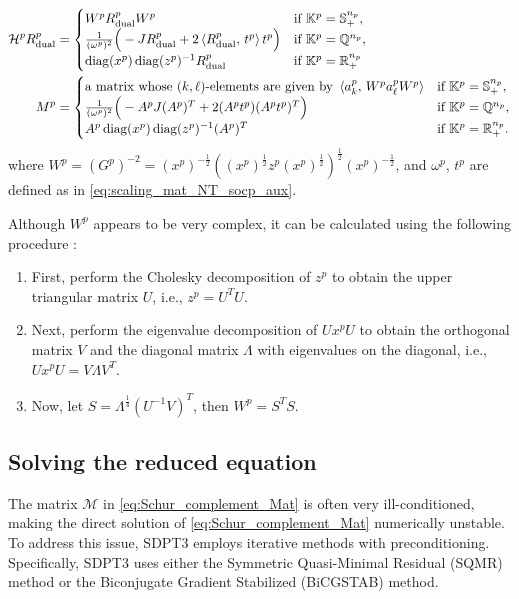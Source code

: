 \begin{align}
    \mathcal{H}^p R^p_{\text{dual}} &= \begin{cases}
        W^p R^p_{\text{dual}} W^p & \text{if } \mathbb{K}^p = \mathbb{S}^{n_p}_+, \\
        \frac{1}{(\omega^p)^2} \Big(-J R^p_{\text{dual}} + 2\left\langle R^p_{\text{dual}}, \, t^p \right\rangle t^p\Big) & \text{if } \mathbb{K}^p = \mathbb{Q}^{n_p},\\
        \operatorname{diag}(x^p) \operatorname{diag}(z^p)^{-1} R^p_{\text{dual}} & \text{if } \mathbb{K}^p = \mathbb{R}^{n_p}_+
    \end{cases}\\
    M^p &= \begin{cases}
        \text{a matrix whose $(k,\ell)$-elements are given by } \left\langle a^p_k, \, W^p a^p_\ell W^p \right\rangle & \text{if } \mathbb{K}^p = \mathbb{S}^{n_p}_+,\\
        \frac{1}{(\omega^p)^2}\Big(-A^p J (A^p)^T + 2 (A^p t^p)(A^p t^p)^T \Big) & \text{if } \mathbb{K}^p = \mathbb{Q}^{n_p}, \\
        A^p \operatorname{diag}(x^p) \operatorname{diag}(z^p)^{-1} (A^p)^T & \text{if } \mathbb{K}^p = \mathbb{R}^{n_p}_+.
    \end{cases} \label{eq:NT_M}
\end{align}
where $W^p = (G^p)^{-2} = (x^p)^{-\frac{1}{2}}((x^p)^{\frac{1}{2}} z^p (x^p)^{\frac{1}{2}})^{\frac{1}{2}} (x^p)^{-\frac{1}{2}}$, and $\omega^p$, $t^p$ are defined as in \eqref{eq:scaling_mat_NT_socp_aux}.

Although $W^p$ appears to be very complex, it can be calculated using the following procedure \cite{todd1998}:
\begin{enumerate}
    \item First, perform the Cholesky decomposition of $z^p$ to obtain the upper triangular matrix $U$, i.e., $z^p=U^TU$.
    \item Next, perform the eigenvalue decomposition of $U x^p U$ to obtain the orthogonal matrix $V$ and the diagonal matrix $\Lambda$ with eigenvalues on the diagonal, i.e., $U x^p U = V \Lambda V^T$.
    \item Now, let $S=\Lambda^\frac{1}{4}(U^{-1}V)^T$, then $W^p=S^T S$.
\end{enumerate}


\subsection{Solving the reduced equation} \label{sec:solve_reduced_eq}
The matrix $\mathcal{M}$ in \eqref{eq:Schur_complement_Mat} is often very ill-conditioned, making the direct solution of \eqref{eq:Schur_complement_Mat} numerically unstable. 
To address this issue, SDPT3 employs iterative methods with preconditioning. 
Specifically, SDPT3 \cite{toh1999} uses either the Symmetric Quasi-Minimal Residual (SQMR) method \cite{Freund1994} or the Biconjugate Gradient Stabilized (BiCGSTAB) method.

